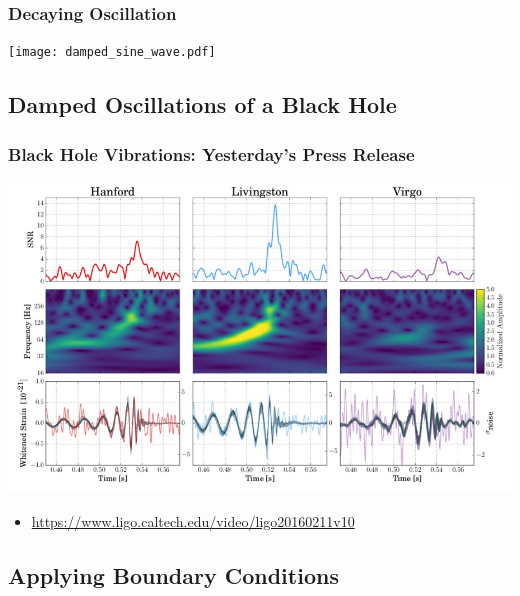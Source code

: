 \documentclass[pdf,hideothersubsections]{beamer}
\begin{document}
\begin{frame}
\frametitle{Decaying Oscillation}

\centering
\texttt{[image: damped\_sine\_wave.pdf]}

\end{frame}


\subsection{Damped Oscillations of a Black Hole}
\begin{frame}
\frametitle{Black Hole Vibrations: Yesterday's Press Release}
\centering
\includegraphics[width=\textwidth]{GW170814-TF.jpg}

\begin{itemize}
   \item \url{https://www.ligo.caltech.edu/video/ligo20160211v10}
\end{itemize}
\end{frame}


\subsection{Applying Boundary Conditions}

\end{document}

